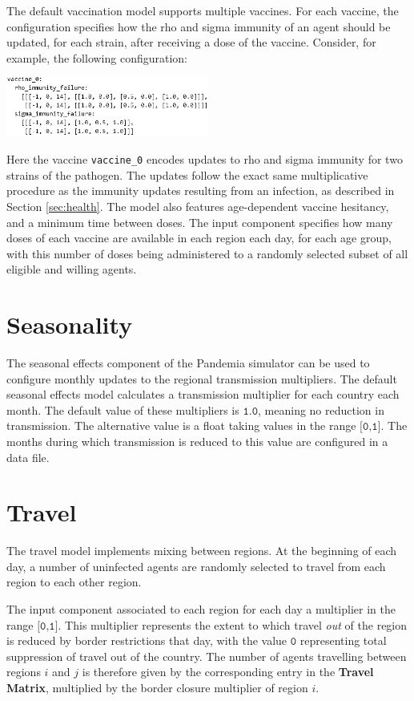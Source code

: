 \documentclass[10pt,letterpaper]{article}
\begin{document}
The default vaccination model supports multiple vaccines. For each vaccine, the configuration specifies how the rho and sigma immunity of an agent should be updated, for each strain, after receiving a dose of the vaccine. Consider, for example, the following configuration:
\begin{center}
\includegraphics[width=0.5\textwidth]{codeexample2bw}
\end{center}
Here the vaccine \texttt{vaccine{\_0}} encodes updates to rho and sigma immunity for two strains of the pathogen. The updates follow the exact same multiplicative procedure as the immunity updates resulting from an infection, as described in Section \ref{sec:health}. The model also features age-dependent vaccine hesitancy, and a minimum time between doses. The input component specifies how many doses of each vaccine are available in each region each day, for each age group, with this number of doses being administered to a randomly selected subset of all eligible and willing agents.

\section{Seasonality}

The seasonal effects component of the Pandemia simulator can be used to configure monthly updates to the regional transmission multipliers. The default seasonal effects model calculates a transmission multiplier for each country each month. The default value of these multipliers is $\texttt{1.0}$, meaning no reduction in transmission. The alternative value is a float taking values in the range $\texttt{[0,1]}$. The months during which transmission is reduced to this value are configured in a data file.

\section{Travel}

The travel model implements mixing between regions. At the beginning of each day, a number of uninfected agents are randomly selected to travel from each region to each other region.

The input component associated to each region for each day a multiplier in the range $\texttt{[0,1]}.$ This multiplier represents the extent to which travel \textit{out} of the region is reduced by border restrictions that day, with the value $\texttt{0}$ representing total suppression of travel out of the country. The number of agents travelling between regions $i$ and $j$ is therefore given by the corresponding entry in the \textbf{Travel Matrix}, multiplied by the border closure multiplier of region $i$.
\end{document}
